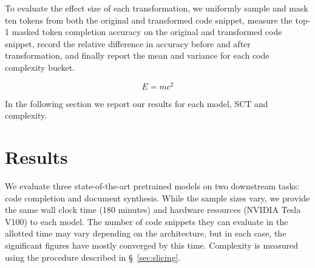 \documentclass[sigconf,review,anonymous]{acmart}
\begin{document}
  To evaluate the effect size of each transformation, we uniformly sample and mask ten tokens from both the original and transformed code snippet, measure the top-1 masked token completion accuracy on the original and transformed code snippet, record the relative difference in accuracy before and after transformation, and finally report the mean and variance for each code complexity bucket.

  \begin{equation}
    E=mc^2
  \end{equation}

  In the following section we report our results for each model, SCT and complexity.

  \pagebreak\section{Results}\label{sec:results}

  We evaluate three state-of-the-art pretrained models on two downstream tasks: code completion and document synthesis. While the sample sizes vary, we provide the same wall clock time (180 minutes) and hardware resources (NVIDIA Tesla V100) to each model. The number of code snippets they can evaluate in the allotted time may vary depending on the architecture, but in each case, the significant figures have mostly converged by this time. Complexity is measured using the procedure described in \S~\ref{sec:slicing}.
\end{document}
